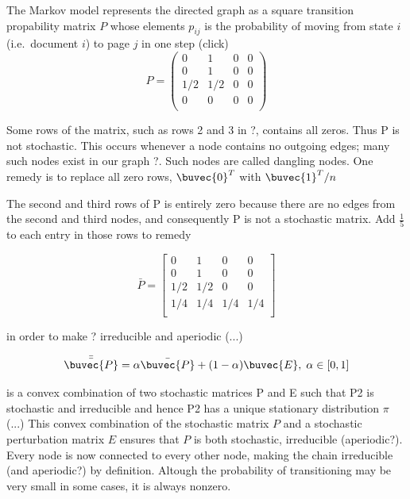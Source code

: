 The Markov model represents the directed graph as a square transition propability matrix $P$ whose elements $p_{ij}$ is the probability of moving from state $i$ (i.e.\ document $i$) to page $j$ in one step (click)
\begin{equation}
P =
 \left(
 \begin{array}{cccc}
  0   & 1   & 0 & 0 \\
  0   & 1   & 0 & 0 \\
  1/2 & 1/2 & 0 & 0 \\
  0   & 0   & 0 & 0 \\
 \end{array}
 \right)
\end{equation}

Some rows of the matrix, such as rows 2 and 3 in ?, contains all zeros. Thus P is not stochastic. This occurs whenever a node contains no outgoing edges; many such nodes exist in our graph ?. Such nodes are called dangling nodes. One remedy is to replace all zero rows, $\buvec{0}^T$ with $\buvec{1}^T/n$

The second and third rows of P is entirely zero because there are no edges from the second and third nodes, and consequently P is not a stochastic matrix. Add $\frac{1}{5}$ to each entry in those rows to remedy

\begin{equation}
\bar{P} =
 \left[
 \begin{array}{ccccc}
  0   & 1   &   0 &   0 \\
  0   & 1   &   0 &   0 \\
  1/2 & 1/2 &   0 &   0 \\
  1/4 & 1/4 & 1/4 & 1/4 \\
 \end{array}
 \right]
\end{equation}


in order to make ? irreducible and aperiodic (...)

\begin{equation}
\bar{\bar{\buvec{P}}} = \alpha \bar{\buvec{P}} + (1-\alpha) \buvec{E} , \; \alpha \in [0,1]
\end{equation}


is a convex combination of two stochastic matrices P and E such that P2 is stochastic and irreducible and hence P2 has a unique stationary distribution $\pi$ (...) This convex combination of the stochastic matrix $P$ and a stochastic perturbation matrix $E$ ensures that $P$ is both stochastic, irreducible (aperiodic?). Every node is now connected to every other node, making the chain irreducible (and aperiodic?) by definition. Altough the probability of transitioning may be very small in some cases, it is always nonzero.

